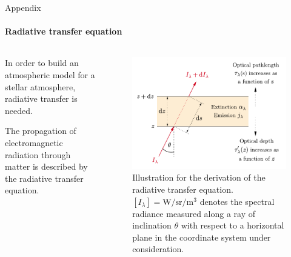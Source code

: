 \documentclass{beamer}
\begin{document}
\begin{frame}[allowframebreaks]{Appendix}
	\framesubtitle{Radiative transfer equation}
	\begin{columns}
		\begin{column}{0.39\textwidth}
			In order to build an atmospheric model for a stellar atmosphere, radiative transfer is needed.
			
			The propagation of electromagnetic radiation through matter is described by the radiative transfer equation.
		\end{column}
		\begin{column}{0.6\textwidth}
			\begin{figure}[h]
				\centering
				\includegraphics[width=\textwidth]{figures/thesis/radiative-transfer-equation.pdf}
				\caption{Illustration for the derivation of the radiative transfer equation. $[I_\lambda] = \si{\watt\per\steradian\per\cubic\meter}$ denotes the spectral radiance measured along a ray of inclination $\theta$ with respect to a horizontal plane in the coordinate system under consideration.}
			\end{figure}
		\end{column}
	\end{columns}
\end{frame}
\end{document}
